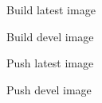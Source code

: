 Build latest image 
\begin{DoxyCode}{0}
\end{DoxyCode}


Build devel image 
\begin{DoxyCode}{0}
\end{DoxyCode}


Push latest image 
\begin{DoxyCode}{0}
\end{DoxyCode}


Push devel image 
\begin{DoxyCode}{0}
\end{DoxyCode}
 